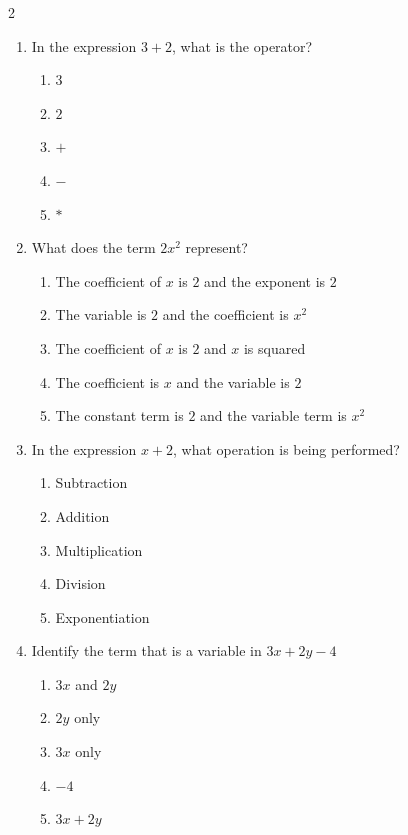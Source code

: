 \documentclass[10pt]{article}
\begin{document}
\begin{multicols}{2}
\begin{enumerate}[label=\textbf{Q\arabic*.}, leftmargin=*, itemsep=6pt, parsep=0pt]
  \item \small In the expression $3 + 2$, what is the operator?
  \begin{enumerate}[label=(\Alph*), leftmargin=0.6cm, nosep, itemsep=2pt]
    \item $3$
    \item $2$
    \item $+$
    \item $-$
    \item $*$
  \end{enumerate}

  \item \small What does the term $2x^2$ represent?
  \begin{enumerate}[label=(\Alph*), leftmargin=0.6cm, nosep, itemsep=2pt]
    \item The coefficient of $x$ is $2$ and the exponent is $2$
    \item The variable is $2$ and the coefficient is $x^2$
    \item The coefficient of $x$ is $2$ and $x$ is squared
    \item The coefficient is $x$ and the variable is $2$
    \item The constant term is $2$ and the variable term is $x^2$
  \end{enumerate}

  \item \small In the expression $x + 2$, what operation is being performed?
  \begin{enumerate}[label=(\Alph*), leftmargin=0.6cm, nosep, itemsep=2pt]
    \item Subtraction
    \item Addition
    \item Multiplication
    \item Division
    \item Exponentiation
  \end{enumerate}

  \item \small Identify the term that is a variable in $3x + 2y - 4$
  \begin{enumerate}[label=(\Alph*), leftmargin=0.6cm, nosep, itemsep=2pt]
    \item $3x$ and $2y$
    \item $2y$ only
    \item $3x$ only
    \item $-4$
    \item $3x + 2y$
  \end{enumerate}


\end{enumerate}
\end{multicols}
\end{document}
